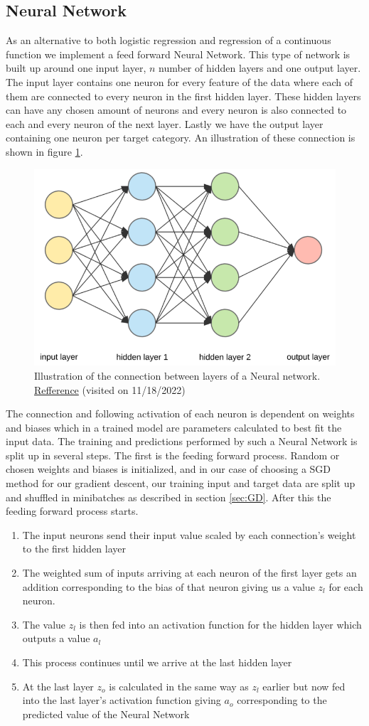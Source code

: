 \documentclass[11pt]{article}
\begin{document}
\subsection{Neural Network}
As an alternative to both logistic regression and regression of a continuous function we implement a feed forward Neural Network. This type of network is built up around one input layer, $n$ number of hidden layers and one output layer. The input layer contains one neuron for every feature of the data where each of them are connected to every neuron in the first hidden layer. These hidden layers can have any chosen amount of neurons and every neuron is also connected to each and every neuron of the next layer. Lastly we have the output layer containing one neuron per target category. An illustration of these connection is shown in figure \ref{fig:NN_layers}.
\begin{figure}[H]
    \centering
    \includegraphics[width=.5\textwidth]{../figures/NN_layers.png}
    \caption{Illustration of the connection between layers of a Neural network. \href{https://towardsdatascience.com/applied-deep-learning-part-1-artificial-neural-networks-d7834f67a4f6}{Refference} (visited on 11/18/2022)}
    \label{fig:NN_layers}
\end{figure}
The connection and following activation of each neuron is dependent on weights and biases which in a trained model are parameters calculated to best fit the input data. The training and predictions performed by such a Neural Network is split up in several steps. The first is the feeding forward process. Random or chosen weights and biases is initialized, and in our case of choosing a SGD method for our gradient descent, our training input and target data are split up and shuffled in minibatches as described in section \ref{sec:GD}. After this the feeding forward process starts.
\begin{enumerate}
    \item The input neurons send their input value scaled by each connection's weight to the first hidden layer
    \item The weighted sum of inputs arriving at each neuron of the first layer gets an addition corresponding to the bias of that neuron giving us a value $z_l$ for each neuron.
    \item The value $z_l$ is then fed into an activation function for the hidden layer which outputs a value $a_l$
    \item This process continues until we arrive at the last hidden layer
    \item At the last layer $z_o$ is calculated in the same way as $z_l$ earlier but now fed into the last layer's activation function giving $a_o$ corresponding to the predicted value of the Neural Network
\end{enumerate}
\end{document}
